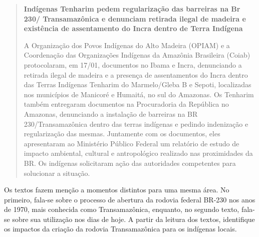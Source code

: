 \begin{quote}
\textbf{Indígenas Tenharim pedem regularização das barreiras na Br 230/ Transamazônica e denunciam retirada ilegal de madeira e existência de assentamento do Incra dentro de Terra Indígena}

A Organização dos Povos Indígenas do Alto Madeira (OPIAM) e a
Coordenação das Organizações Indígenas da Amazônia Brasileira (Coiab)
protocolaram, em 17/01, documentos no Ibama e Incra, denunciando a
retirada ilegal de madeira e a presença de assentamentos do Incra dentro
das Terras Indígenas Tenharim do Marmelo/Gleba B e Sepoti, localizadas
nos municípios de Manicoré e Humaitá, no sul do Amazonas. Os Tenharim
também entregaram documentos na Procuradoria da República no Amazonas,
denunciando a instalação de barreiras na BR 230/Transamazônica dentro
das terras indígenas e pedindo indenização e regularização das mesmas.
Juntamente com os documentos, eles apresentaram ao Ministério Público
Federal um relatório de estudo de impacto ambiental, cultural e
antropológico realizado nas proximidades da BR. Os indígenas solicitaram
ação das autoridades competentes para solucionar a situação.

\end{quote}

Os textos fazem menção a momentos distintos para uma mesma área. No
primeiro, fala-se sobre o processo de abertura da rodovia federal BR-230
nos anos de 1970, mais conhecida como Transamazônica, enquanto, no
segundo texto, fala-se sobre sua utilização nos dias de hoje. A partir
da leitura dos textos, identifique os impactos da criação da rodovia
Transamazônica para os indígenas locais.


